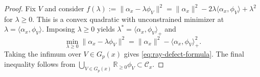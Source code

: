 \documentclass[11pt]{article}
\numberwithin{equation}{section}  %
\theoremstyle{plain}
\theoremstyle{definition}
\theoremstyle{remark}
\newcommand{\R}{\mathbb{R}}
\newcommand{\dist}{\mathrm{dist}}
\newcommand{\cone}{\mathrm{cone}}
\newcommand{\distcone}{\dist_{\cone}}        %
\newcommand{\Gp}{G_p}
\begin{document}
\begin{proof}
Fix $V$ and consider $f(\lambda):=\|\alpha_{x}-\lambda\phi_{V}\|^{2}
=\|\alpha_{x}\|^{2}-2\lambda\langle \alpha_{x},\phi_{V}\rangle+\lambda^{2}$ for $\lambda\ge 0$.
This is a convex quadratic with unconstrained minimizer at $\lambda=\langle \alpha_{x},\phi_{V}\rangle$.
Imposing $\lambda\ge 0$ yields $\lambda^{*}=\langle \alpha_{x},\phi_{V}\rangle_{+}$ and
\[
\min_{\lambda\ge 0}\|\alpha_{x}-\lambda\phi_{V}\|^{2}
=\|\alpha_{x}\|^{2}-\langle \alpha_{x},\phi_{V}\rangle_{+}^{2}.
\]
Taking the infimum over $V\in\Gp(x)$ gives \eqref{eq:ray-defect-formula}.
The final inequality follows from $\bigcup_{V\in\Gp(x)}\R_{\ge 0}\phi_{V}\subset\mathcal{C}_{x}$.
\end{proof}

\end{document}

